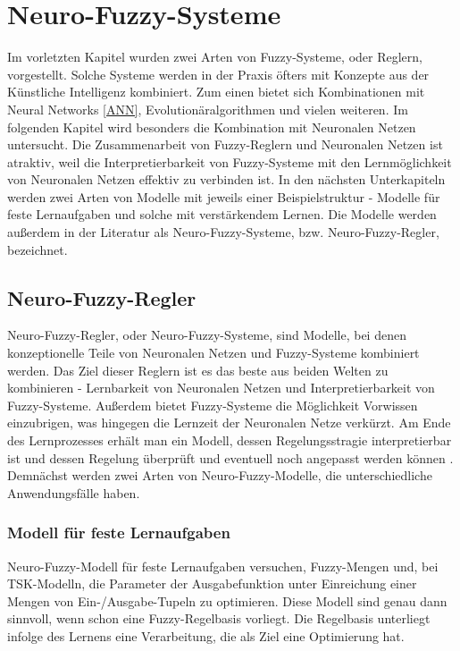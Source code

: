 \chapter{Neuro-Fuzzy-Systeme}

Im vorletzten Kapitel wurden zwei Arten von Fuzzy-Systeme, oder Reglern, vorgestellt. Solche Systeme werden in der Praxis öfters mit Konzepte aus der Künstliche Intelligenz kombiniert. Zum einen bietet sich Kombinationen mit Neural Networks \ref{ANN}, Evolutionäralgorithmen und vielen weiteren. Im folgenden Kapitel wird besonders die Kombination mit Neuronalen Netzen untersucht. Die Zusammenarbeit von Fuzzy-Reglern und Neuronalen Netzen ist atraktiv, weil die Interpretierbarkeit von Fuzzy-Systeme mit den Lernmöglichkeit von Neuronalen Netzen effektiv zu verbinden ist. In den nächsten Unterkapiteln werden zwei Arten von Modelle mit jeweils einer Beispielstruktur - Modelle für feste Lernaufgaben und solche mit verstärkendem Lernen. Die Modelle werden außerdem in der Literatur als Neuro-Fuzzy-Systeme, bzw. Neuro-Fuzzy-Regler, bezeichnet. \cite{CIKruse:15}
\section{Neuro-Fuzzy-Regler}

Neuro-Fuzzy-Regler, oder Neuro-Fuzzy-Systeme, sind Modelle, bei denen konzeptionelle Teile von Neuronalen Netzen und Fuzzy-Systeme kombiniert werden. Das Ziel dieser Reglern ist es das beste aus beiden Welten zu kombinieren - Lernbarkeit von Neuronalen Netzen und Interpretierbarkeit von Fuzzy-Systeme. Außerdem bietet Fuzzy-Systeme die Möglichkeit Vorwissen einzubrigen, was hingegen die Lernzeit der Neuronalen Netze verkürzt. Am Ende des Lernprozesses erhält man ein Modell, dessen Regelungsstragie interpretierbar ist und dessen Regelung überprüft und eventuell noch angepasst werden können \cite{CIKruse:15}. Demnächst werden zwei Arten von Neuro-Fuzzy-Modelle, die unterschiedliche Anwendungsfälle haben.

\subsection{Modell f\"{u}r feste Lernaufgaben}

Neuro-Fuzzy-Modell für feste Lernaufgaben versuchen, Fuzzy-Mengen und, bei TSK-Modelln, die Parameter der Ausgabefunktion unter Einreichung einer Mengen von Ein-/Ausgabe-Tupeln zu optimieren. Diese Modell sind genau dann sinnvoll, wenn schon eine Fuzzy-Regelbasis vorliegt. Die Regelbasis unterliegt infolge des Lernens eine Verarbeitung, die als Ziel eine Optimierung hat. %

